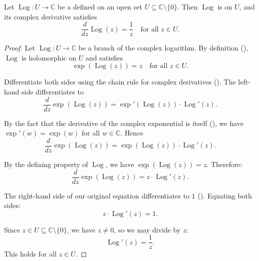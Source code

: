 \begin{proposition} \label{proposition:complex_derivative_of_a_branch_of_complex_logarithm_is_reciprocal}
    Let $\operatorname{Log} : U \to \mathbb{C}$ be a  defined on an open set $U \subseteq \mathbb{C} \setminus \{0\}$. Then $\operatorname{Log}$ is  on $U$, and its complex derivative satisfies
    $$\frac{d}{dz} \operatorname{Log}(z) = \frac{1}{z} \quad \text{for all } z \in U.$$
\end{proposition}
\begin{proof}
    Let $\operatorname{Log} : U \to \mathbb{C}$ be a branch of the complex logarithm. By definition (), $\operatorname{Log}$ is holomorphic on $U$ and satisfies
    $$\exp(\operatorname{Log}(z)) = z \quad \text{for all } z \in U.$$

    Differentiate both sides using the chain rule for complex derivatives (). The left-hand side differentiates to
    $$\frac{d}{dz} \exp(\operatorname{Log}(z)) = \exp'(\operatorname{Log}(z)) \cdot \operatorname{Log}'(z).$$

    By the fact that the derivative of the complex exponential is itself (), we have $\exp'(w) = \exp(w)$ for all $w \in \mathbb{C}$. Hence
    $$\frac{d}{dz} \exp(\operatorname{Log}(z)) = \exp(\operatorname{Log}(z)) \cdot \operatorname{Log}'(z).$$

    By the defining property of $\operatorname{Log}$, we have $\exp(\operatorname{Log}(z)) = z$. Therefore:
    $$\frac{d}{dz} \exp(\operatorname{Log}(z)) = z \cdot \operatorname{Log}'(z).$$

    The right-hand side of our original equation differentiates to $1$ (). Equating both sides:
    $$z \cdot \operatorname{Log}'(z) = 1.$$

    Since $z \in U \subseteq \mathbb{C} \setminus \{0\}$, we have $z \neq 0$, so we may divide by $z$:
    $$\operatorname{Log}'(z) = \frac{1}{z}.$$
    This holds for all $z \in U$.
\end{proof}
